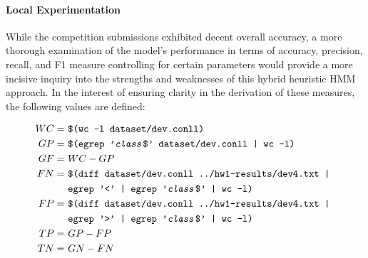 \documentclass[11pt,a4paper]{article}
\begin{document}
\paragraph{Local Experimentation}
While the competition submissions exhibited decent overall accuracy,
a more thorough examination of the model's performance in
terms of accuracy, precision, recall, and F1 measure controlling
for certain parameters would provide a more incisive inquiry
into the strengths and weaknesses of this hybrid heuristic HMM approach.
In the interest of ensuring clarity in the derivation of these measures,
the following values are defined:

{\tiny
\begin{align*}{}
  WC =&\ \texttt{\$(wc -l dataset/dev.conll)} \\
  GP =&\ \texttt{\$(egrep '\emph{class}\$' dataset/dev.conll | wc -l)} \\
  GF =&\ WC - GP \\
  FN =&\ \texttt{\$(diff dataset/dev.conll ../hw1-results/dev4.txt | } \\
     &\  \texttt{egrep '<' | egrep '\emph{class}\$' | wc -l)} \\
  FP =&\ \texttt{\$(diff dataset/dev.conll ../hw1-results/dev4.txt | } \\
     &\  \texttt{egrep '>' | egrep '\emph{class}\$' | wc -l)} \\
  TP =&\ GP - FP \\
  TN =&\ GN - FN
\end{align*}}

\paragraph{}
\end{document}
